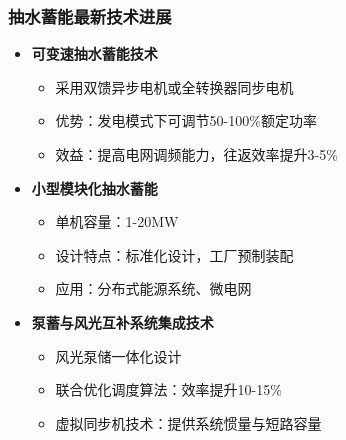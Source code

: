 \documentclass[aspectratio=169]{beamer}
\begin{document}
\begin{frame}
    \frametitle{抽水蓄能最新技术进展}
    \begin{itemize}
        \item \textbf{可变速抽水蓄能技术}
        \begin{itemize}
            \item 采用双馈异步电机或全转换器同步电机
            \item 优势：发电模式下可调节50-100\%额定功率
            \item 效益：提高电网调频能力，往返效率提升3-5\%
        \end{itemize}
        
        \item \textbf{小型模块化抽水蓄能}
        \begin{itemize}
            \item 单机容量：1-20MW
            \item 设计特点：标准化设计，工厂预制装配
            \item 应用：分布式能源系统、微电网
        \end{itemize}
        
        \item \textbf{泵蓄与风光互补系统集成技术}
        \begin{itemize}
            \item 风光泵储一体化设计
            \item 联合优化调度算法：效率提升10-15\%
            \item 虚拟同步机技术：提供系统惯量与短路容量
        \end{itemize}
    \end{itemize}
\end{frame}
\end{document}
